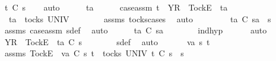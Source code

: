 \ {\isachardoublequoteopen}t\ {\isasymle}\isactrlsub C\ s{}{\isacharprime}{\isachardoublequoteclose}\isanewline
\ \ \isamarkupfalse%
\ auto\isanewline
\ \ \ \ \isamarkupfalse%
\ ta\isanewline
\ \ \ \ \isamarkupfalse%
\ case{\isacharunderscore}assm{\isacharcolon}\ {\isachardoublequoteopen}t\ {\isacharequal}\ {\isacharbrackleft}Y{\isacharbrackright}\isactrlsub R\ {\isacharhash}\ {\isacharbrackleft}Tock{\isacharbrackright}\isactrlsub E\ {\isacharhash}\ ta{\isachardoublequoteclose}\isanewline
\ \ \ \ \isamarkupfalse%
\ \isamarkupfalse%
\ {}{\isacharcolon}\ {\isachardoublequoteopen}ta\ {\isasymin}\ tocks\ UNIV{\isachardoublequoteclose}\isanewline
\ \ \ \ \ \ \isamarkupfalse%
\ assms{\isacharparenleft}{}{\isacharparenright}\ tocks{\isachardot}cases\ \isamarkupfalse%
\ auto\isanewline
\ \ \ \ \isamarkupfalse%
\ \isamarkupfalse%
\ {}{\isacharcolon}\ {\isachardoublequoteopen}ta\ {\isasymle}\isactrlsub C\ s{}{\isacharprime}a\ {\isacharat}\ s{}{\isachardoublequoteclose}\isanewline
\ \ \ \ \ \ \isamarkupfalse%
\ assms{\isacharparenleft}{}{\isacharparenright}\ case{\isacharunderscore}assm\ s{}{\isacharprime}{\isacharunderscore}def\ \isamarkupfalse%
\ auto\isanewline
\ \ \ \ \isamarkupfalse%
\ {\isachardoublequoteopen}ta\ {\isasymle}\isactrlsub C\ s{}{\isacharprime}a{\isachardoublequoteclose}\isanewline
\ \ \ \ \ \ \isamarkupfalse%
\ ind{\isacharunderscore}hyp\ {}\ {}\ {}\ {}\ \isamarkupfalse%
\ auto\isanewline
\ \ \ \ \isamarkupfalse%
\ \isamarkupfalse%
\ {\isachardoublequoteopen}{\isacharbrackleft}Y{\isacharbrackright}\isactrlsub R\ {\isacharhash}\ {\isacharbrackleft}Tock{\isacharbrackright}\isactrlsub E\ {\isacharhash}\ ta\ {\isasymle}\isactrlsub C\ s{}{\isacharprime}{\isachardoublequoteclose}\isanewline
\ \ \ \ \ \ \isamarkupfalse%
\ s{}{\isacharprime}{\isacharunderscore}def\ \isamarkupfalse%
\ auto\isanewline
\ \ \isamarkupfalse%
\isanewline
{}\isamarkupfalse%
\isanewline
\ \ \isamarkupfalse%
\ va\ s{}{\isacharprime}\ t\isanewline
\ \ \isamarkupfalse%
\ assms{\isacharcolon}\ {\isachardoublequoteopen}{\isacharbrackleft}Tock{\isacharbrackright}\isactrlsub E\ {\isacharhash}\ va\ {\isasymsubseteq}\isactrlsub C\ s{}{\isacharprime}{\isachardoublequoteclose}\ {\isachardoublequoteopen}t\ {\isasymin}\ tocks\ UNIV{\isachardoublequoteclose}\ {\isachardoublequoteopen}t\ {\isasymle}\isactrlsub C\ s{}{\isacharprime}\ {\isacharat}\ s{}{\isachardoublequoteclose}\isanewline
